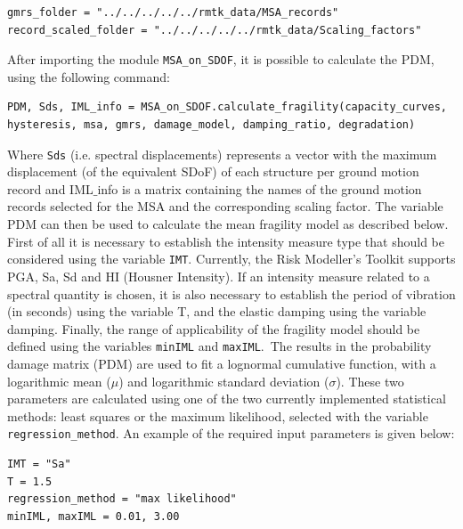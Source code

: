 \begin{Verbatim}[frame=single, commandchars=\\\{\}, samepage=true]
gmrs_folder = "../../../../../rmtk_data/MSA_records"
record_scaled_folder = "../../../../../rmtk_data/Scaling_factors"
\end{Verbatim}

After importing the module \verb=MSA_on_SDOF=, it is possible to calculate the PDM, using the following command:

\begin{Verbatim}[frame=single, commandchars=\\\{\}, samepage=true]
PDM, Sds, IML_info = MSA_on_SDOF.calculate_fragility(capacity_curves,
hysteresis, msa, gmrs, damage_model, damping_ratio, degradation)
\end{Verbatim}

Where \verb=Sds= (i.e. spectral displacements) represents a vector with the maximum displacement (of the equivalent SDoF) of each structure per ground motion record and IML$\_$info is a matrix containing the names of the ground motion records selected for the MSA and the corresponding scaling factor. The variable PDM can then be used to calculate the mean fragility model as described below.\\

First of all it is necessary to establish the intensity measure type that should be considered using the variable \verb=IMT=. Currently, the Risk Modeller’s Toolkit supports PGA, Sa, Sd and HI (Housner Intensity). If an intensity measure related to a spectral quantity is chosen, it is also necessary to establish the period of vibration (in seconds) using the variable T, and the elastic damping using the variable damping. Finally, the range of applicability of the fragility model should be defined using the variables \verb=minIML= and \verb=maxIML=.\
The results in the probability damage matrix (PDM) are used to fit a lognormal cumulative function, with a logarithmic mean ($\mu$) and logarithmic standard deviation ($\sigma$). These two parameters are calculated using one of the two currently implemented statistical methods: least squares or the maximum likelihood, selected with the variable \verb=regression_method=. An example of the required input parameters is given below:

\begin{Verbatim}[frame=single, commandchars=\\\{\}, samepage=true]
IMT = "Sa"
T = 1.5
regression_method = "max likelihood"
minIML, maxIML = 0.01, 3.00
\end{Verbatim}

